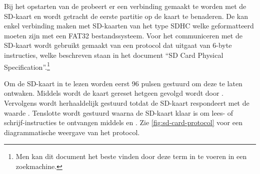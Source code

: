 
Bij het opstarten van de \launcher probeert er een verbinding gemaakt te worden met de SD-kaart en wordt getracht de eerste partitie op de kaart te benaderen. De \product kan enkel verbinding maken met SD-kaarten van het type SDHC welke geformatteerd moeten zijn met een FAT32 bestandssysteem. Voor het communiceren met de SD-kaart wordt gebruikt gemaakt van een protocol dat uitgaat van 6-byte instructies, welke beschreven staan in het document ``SD Card Physical Specification''.\footnote{Men kan dit document het beste vinden door deze term in te voeren in een zoekmachine.}

Om de SD-kaart in te lezen worden eerst 96 pulsen gestuurd om deze te laten ontwaken. Middels  wordt de kaart gereset hetgeen gevolgd wordt door . Vervolgens wordt herhaaldelijk  gestuurd totdat de SD-kaart respondeert met de waarde . Tenslotte wordt  gestuurd waarna de SD-kaart klaar is om lees- of schrijf-instructies te ontvangen middels  en . Zie \cref{fig:sd-card-protocol} voor een diagrammatische weergave van het protocol.

